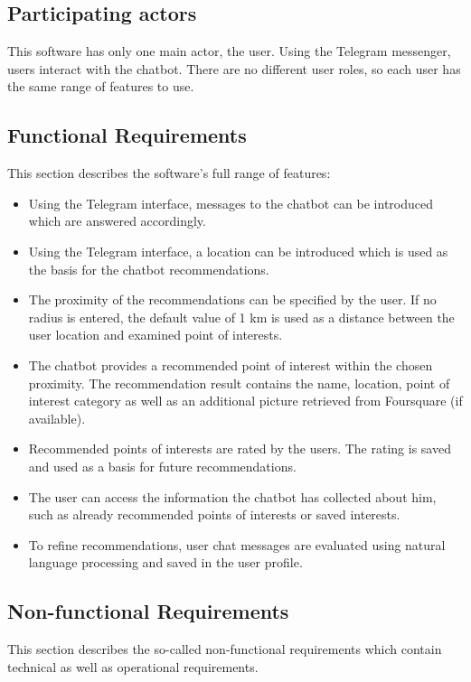 \subsection{Participating actors}
This software has only one main actor, the user. Using the Telegram messenger, users interact with the chatbot. There are no different user roles, so each user has the same range of features to use. 

\subsection{Functional Requirements}
	This section describes the software’s full range of features:
	
\begin{itemize}
\item Using the Telegram interface, messages to the chatbot can be introduced which are answered accordingly.
\item Using the Telegram interface, a location can be introduced which is used as the basis for the chatbot recommendations.
\item The proximity of the recommendations can be specified by the user. If no radius is entered, the default value of 1 km is used as a distance between the user location and examined point of interests.
\item The chatbot provides a recommended point of interest within the chosen proximity. The recommendation result contains the name, location, point of interest category as well as an additional picture retrieved from Foursquare (if available).
\item Recommended points of interests are rated by the users. The rating is saved and used as a basis for future recommendations.
\item The user can access the information the chatbot has collected about him, such as already recommended points of interests or saved interests.
\item To refine recommendations, user chat messages are evaluated using natural language processing and saved in the user profile.
\end{itemize}

\subsection{Non-functional Requirements}
This section describes the so-called non-functional requirements which contain technical as well as operational requirements.

